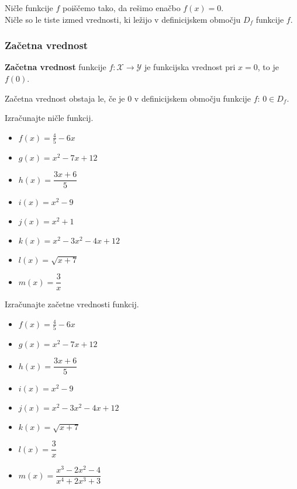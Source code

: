         Ničle funkcije $f$ poiščemo tako, da rešimo enačbo $f(x)=0$. \\
        Ničle so le tiste izmed vrednosti, ki ležijo v definicijskem območju $D_f$ funkcije $f$.

        
    \subsubsection*{Začetna vrednost}
        \textbf{Začetna vrednost} funkcije $f:\mathcal{X}\to\mathcal{Y}$ je funkcijska vrednost pri $x=0$, to je $f(0)$.

        Začetna vrednost obstaja le, če je $0$ v definicijskem območju funkcije $f$: $0\in D_f$.

        





    \begin{naloga}
        Izračunajte ničle funkcij.
                \begin{multicols}{2}

            \begin{itemize}
                \item $f(x)=\frac{4}{5}-6x$ 
                \item $g(x)=x^2-7x+12$ 
                \item $h(x)=\dfrac{3x+6}{5}$ 
                \item $i(x)=x^2-9$ 
                \item $j(x)=x^2+1$ 
                \item $k(x)=x^2-3x^2-4x+12$ 
                \item $l(x)=\sqrt{x+7}$ 
                \item $m(x)=\dfrac{3}{x}$ 
            \end{itemize}
        \end{multicols}
    \end{naloga}


    \begin{naloga}
        Izračunajte začetne vrednosti funkcij.
        \begin{multicols}{2}
            \begin{itemize}
                \item $f(x)=\frac{4}{5}-6x$ 
                \item $g(x)=x^2-7x+12$ 
                \item $h(x)=\dfrac{3x+6}{5}$ 
                \item $i(x)=x^2-9$ 
                \item $j(x)=x^2-3x^2-4x+12$ 
                \item $k(x)=\sqrt{x+7}$ 
                \item $l(x)=\dfrac{3}{x}$ 
                \item $m(x)=\dfrac{x^3-2x^2-4}{x^4+2x^3+3}$ 
            \end{itemize}
        \end{multicols}
    \end{naloga}


